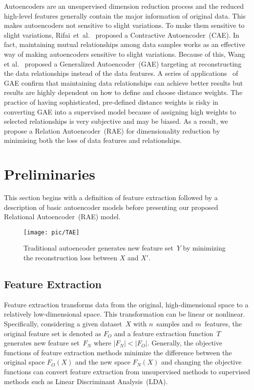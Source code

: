 \documentclass[conference]{IEEEtran}
\begin{document}
	Autoencoders are an unsupervised dimension reduction process and the reduced high-level features generally contain the major information of original data. This makes autoencoders not sensitive to slight variations. To make them sensitive to slight variations, Rifai~et~al.~\cite{rifai2011contractive} proposed a Contractive Autoencoder~(CAE). In fact, maintaining mutual relationships among data samples works as an effective way of making autoencoders sensitive to slight variations. Because of this, Wang et al.~\cite{wang2014generalized} proposed a Generalized Autoencoder~(GAE) targeting at reconstructing the data relationships instead of the data features. A series of applications~\cite{camlica2015autoencoding, stober2015deep, gao2015learning, wang2015dimensionality, meng2016research} of GAE confirm that maintaining data relationships can achieve better results but results are highly dependent on how to define and choose distance weights. The practice of having sophisticated, pre-defined distance weights is risky in converting GAE into a supervised model because of assigning high weights to selected relationships is very subjective and may be biased. As a result, we propose a Relation Autoencoder~(RAE) for dimensionality reduction by minimising both the loss of data features and relationships.
	
	\section{Preliminaries} \label{sec3}
	This section begins with a definition of feature extraction followed by a description of basic autoencoder models before presenting our proposed Relational Autoencoder~(RAE) model.
	\begin{figure}[!t]
		\centering
		\texttt{[image: pic/TAE]}
		\caption{Traditional autoencoder generates new feature set~$Y$ by minimizing the reconstruction loss between $X$ and $X'$.}
		\label{fig_tae}
	\end{figure}
	
	\subsection{Feature Extraction}
	Feature extraction transforms data from the original, high-dimensional space to a relatively low-dimensional space. This transformation can be linear or nonlinear. Specifically, considering a given dataset~$X$ with $n$~samples and $m$~features, the original feature set is denoted as $F_{O}$ and a feature extraction function~$T$ generates new feature set~$F_{N}$ where $|F_{N}|<|F_{O}|$. Generally, the objective functions of feature extraction methods minimize the difference between the original space $F_{O}(X)$ and the new space $F_{N}(X)$ and changing the objective functions can convert feature extraction from unsupervised methods to supervised methods such as Linear Discriminant Analysis~(LDA).
	
\end{document}
